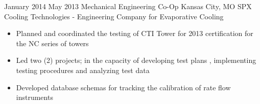 \vspace*{0.1 in}

\Experience
{January 2014}
{May 2013}
{Mechanical Engineering Co-Op}
{Kansas City, MO}
{SPX Cooling Technologies - Engineering Company for Evaporative Cooling}
{
    \begin{itemize}
        \item Planned and coordinated the testing of CTI Tower for 2013
        certification for the NC series of towers
        \item Led two (2) projects; in the capacity of developing test plans
        , implementing testing procedures and analyzing test data
        \item Developed database schemas for tracking the calibration of
        rate flow instruments
    \end{itemize}
}
